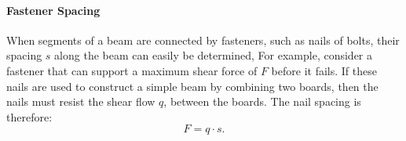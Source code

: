 \paragraph{Fastener Spacing}
When segments of a beam are connected by fasteners, such as nails of bolts, their spacing $s$ along the beam can easily be determined,
For example, consider a fastener that can support a maximum shear force of $F$ before it fails.
If these nails are used to construct a simple beam by combining two boards, then the nails must resist the shear flow $q$, between the boards.
The nail spacing is therefore:
\begin{equation*}
  F = q \cdot s
.\end{equation*}

